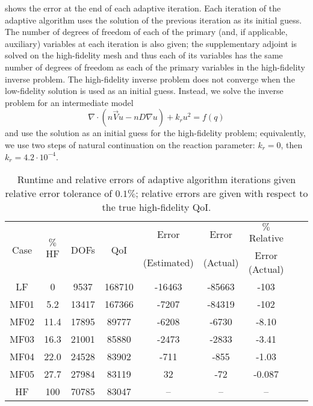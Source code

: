  shows the error at the end of each adaptive iteration. Each iteration of the adaptive algorithm uses the solution of the previous iteration as its initial guess. The number of degrees of freedom of each of the primary (and, if applicable, auxiliary) variables at each iteration is also given; the supplementary adjoint is solved on the high-fidelity mesh and thus each of its variables has the same number of degrees of freedom as each of the primary variables in the high-fidelity inverse problem. The high-fidelity inverse problem does not converge when the low-fidelity solution is used as an initial guess. Instead, we solve the inverse problem for an intermediate model 
%
\begin{equation}
\nabla\cdot(n\vec{V}u - nD\nabla u) + k_ru^2 = f(q)
\end{equation}
%
and use the solution as an initial guess for the high-fidelity problem; equivalently, we use two steps of natural continuation on the reaction parameter: $k_r=0$, then $k_r=4.2\cdot10^{-4}$. 
%
\begin{table}[htbp]
\caption{Runtime and relative errors of adaptive algorithm iterations given relative error tolerance of $0.1\%$; relative errors are given with respect to the true high-fidelity QoI.}
\label{tab:ref3D_diffmesh}
\centering
\begin{tabular}{|c|c|c|c|c|c|c|c|c|}
\hline
\multirow{2}{*}{Case} & \multirow{2}{*}{$\%$HF} & \multirow{2}{*}{DOFs} & \multirow{2}{*}{QoI} & Error & Error & $\%$ Relative \\ 
& & & & (Estimated) & (Actual) & Error (Actual)  \\ \hline
LF   & 0    & 9537  & 168710 & -16463 & -85663 & -103    \\
MF01 & 5.2  & 13417 & 167366 & -7207  & -84319 & -102    \\
MF02 & 11.4 & 17895 & 89777  & -6208  & -6730  & -8.10   \\
MF03 & 16.3 & 21001 & 85880  & -2473  & -2833  & -3.41   \\
MF04 & 22.0 & 24528 & 83902  & -711   & -855   & -1.03   \\
MF05 & 27.7 & 27984 & 83119  & 32     & -72    & -0.087  \\
HF   & 100  & 70785 & 83047  & --     & --     & --    \\ \hline
\end{tabular}
\end{table}
%

